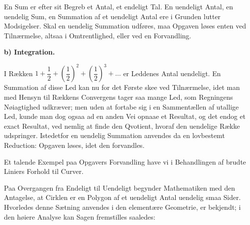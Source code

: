 \documentclass[12pt]{book}
\begin{document}
En Sum er efter sit Begreb et Antal, et endeligt Tal. En uendeligt Antal, en
uendelig Sum, en Summation af et uendeligt Antal ere i Grunden lutter Modsigelser.
Skal en uendelig Summation udføres, maa Opgaven løses enten ved Tilnærmelse, altsaa
i Omtrentlighed, eller ved en Forvandling.

\begin{center}
\textbf{b) Integration.}
\end{center}
{}

I Rækken $1 + \dfrac{1}{2} + \left(\dfrac{1}{2}\right)^{2}
+ \left(\dfrac{1}{2}\right)^{3} + \dots$ er Leddenes Antal uendeligt. En Summation af
disse Led kan nu for det Første skee ved Tilnærmelse, idet man med Hensyn til
Rækkens Convergens tager saa mange Led, som Regningens Nøiagtighed udkræver; men
uden at fortabe sig i en Sammentællen af utallige Led, kunde man dog ogsaa ad en
anden Vei opnaae et Resultat, og det endog et exact Resultat, ved nemlig at finde
den Qvotient, hvoraf den uendelige Række udspringer. Istedetfor en uendelig
Summation anvendes da en lovbestemt Reduction: Opgaven løses, idet den forvandles.

Et talende Exempel paa Opgavers Forvandling have vi i Behandlingen af brudte
Liniers Forhold til Curver.

Paa Overgangen fra Endeligt til Uendeligt begynder Mathematiken med den Antagelse,
at Cirklen er en Polygon af et uendeligt Antal uendelig smaa Sider. Hvorledes denne
Sætning anvendes i den elementære Geometrie, er bekjendt; i den høiere Analyse kan
Sagen fremstilles saaledes:

\begin{center}
\end{center}
\end{document}
